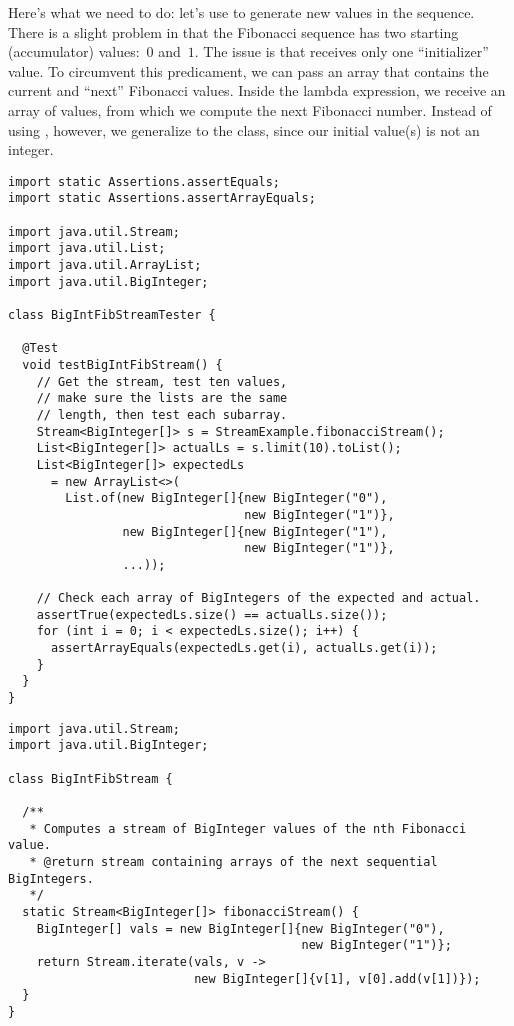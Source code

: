 Here's what we need to do: let's use  to generate new values in the sequence. There is a slight problem in that the Fibonacci sequence has two starting (accumulator) values:~$0$ and~$1$. 
The issue is that  receives only one ``initializer'' value. 
To circumvent this predicament, we can pass an array that contains the current and ``next'' Fibonacci values. 
Inside the lambda expression, we receive an array of values, from which we compute the next Fibonacci number. 
Instead of using , however, we generalize to the  class, since our initial value(s) is not an integer.

\begin{lstlisting}[language=MyJava]
import static Assertions.assertEquals;
import static Assertions.assertArrayEquals;

import java.util.Stream;
import java.util.List;
import java.util.ArrayList;
import java.util.BigInteger;

class BigIntFibStreamTester {

  @Test
  void testBigIntFibStream() {
    // Get the stream, test ten values, 
    // make sure the lists are the same
    // length, then test each subarray.
    Stream<BigInteger[]> s = StreamExample.fibonacciStream();
    List<BigInteger[]> actualLs = s.limit(10).toList();
    List<BigInteger[]> expectedLs 
      = new ArrayList<>(
        List.of(new BigInteger[]{new BigInteger("0"), 
                                 new BigInteger("1")},
                new BigInteger[]{new BigInteger("1"), 
                                 new BigInteger("1")},
                ...));

    // Check each array of BigIntegers of the expected and actual.
    assertTrue(expectedLs.size() == actualLs.size());
    for (int i = 0; i < expectedLs.size(); i++) {
      assertArrayEquals(expectedLs.get(i), actualLs.get(i));
    }
  }
}
\end{lstlisting}

\begin{lstlisting}[language=MyJava]
import java.util.Stream;
import java.util.BigInteger;

class BigIntFibStream {

  /**
   * Computes a stream of BigInteger values of the nth Fibonacci value.
   * @return stream containing arrays of the next sequential BigIntegers.
   */
  static Stream<BigInteger[]> fibonacciStream() {
    BigInteger[] vals = new BigInteger[]{new BigInteger("0"),
                                         new BigInteger("1")};
    return Stream.iterate(vals, v -> 
                          new BigInteger[]{v[1], v[0].add(v[1])});
  }
}
\end{lstlisting}

